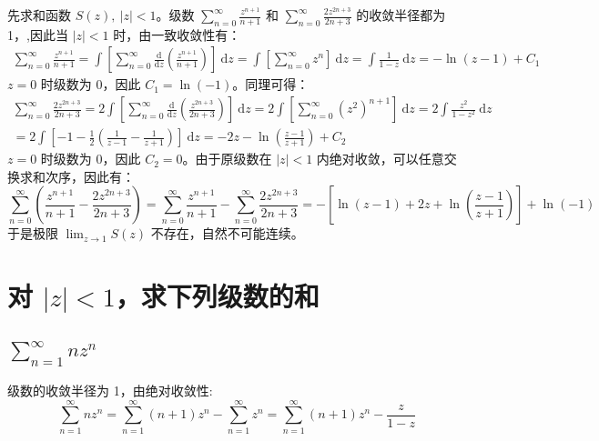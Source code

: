 \documentclass[UTF8]{report}
\theoremstyle{MyLineTheoremStyle} %
\theoremstyle{MyBlockTheoremStyle} %
\theoremstyle{MySubsubsectionStyle} %
\begin{document}
先求和函数 $S(z),\ | z | < 1$。级数 $\sum_{n=0}^{\infty} \frac{z^{n+1}}{n+1}$ 和 $\sum_{n=0}^{\infty} \frac{2z^{2n+3}}{2n+3}$ 的收敛半径都为 1，,因此当 $| z | < 1$ 时，由一致收敛性有：
\begin{gather}
    \sum_{n=0}^{\infty} \frac{z^{n+1}}{n+1} 
    = \int \left[ \sum_{n=0}^{\infty}  \frac{\mathrm{d} }{\mathrm{d} z }  \left(\frac{z^{n+1}}{n+1}\right) \right]\ \mathrm{d}z
    = \int \left[  \sum_{n=0}^{\infty} z^n  \right]\ \mathrm{d}z 
    = \int \frac{1}{1 - z} \ \mathrm{d}z
    = - \ln (z - 1) + C_1
\end{gather}
$z = 0$ 时级数为 0，因此 $C_1 = \ln (-1)$。同理可得：
\begin{gather}
    \sum_{n=0}^{\infty} \frac{2z^{2n+3}}{2n+3}
    = 2 \int \left[ \sum_{n=0}^{\infty}  \frac{\mathrm{d} }{\mathrm{d} z }  \left(\frac{z^{2n+3}}{2n+3}\right) \right]\ \mathrm{d}z
    = 2 \int \left[  \sum_{n=0}^{\infty} \left(z^2\right)^{n+1}  \right]\ \mathrm{d}z 
    = 2 \int \frac{z^2}{1 - z^2} \ \mathrm{d}z \\ 
    = 2 \int \left[ -1 - \frac{1}{2}\left( \frac{1}{z - 1} - \frac{1}{z + 1}\right) \right] \ \mathrm{d}z
    = - 2z - \ln \left(\frac{z - 1}{z + 1}\right)  + C_2
\end{gather}
$z = 0$ 时级数为 0，因此 $C_2 = 0$。由于原级数在 $| z | < 1$ 内绝对收敛，可以任意交换求和次序，因此有：
\begin{equation}
    \sum_{n=0}^{\infty} \left( \frac{z^{n+1}}{n+1} - \frac{2z^{2n+3}}{2n+3} \right) 
    = \sum_{n=0}^{\infty}\frac{z^{n+1}}{n+1} - \sum_{n=0}^{\infty}\frac{2z^{2n+3}}{2n+3}
    =  - \left[ \ln(z - 1) + 2z + \ln \left(\frac{z - 1}{z + 1}\right) \right] + \ln (-1)
\end{equation}
于是极限 $\lim_{z \to 1} S(z)$ 不存在，自然不可能连续。


\section{对 $| z | < 1$，求下列级数的和}



\subsection{$\displaystyle \sum_{n=1}^{\infty} n z^n$}
级数的收敛半径为 1，由绝对收敛性: 
\begin{equation}
    \sum_{n=1}^{\infty} n z^n = \sum_{n=1}^{\infty} (n+1) z^n - \sum_{n=1}^{\infty} z^n = \sum_{n=1}^{\infty} (n+1) z^n - \frac{z}{1 - z}
\end{equation}
\end{document}
